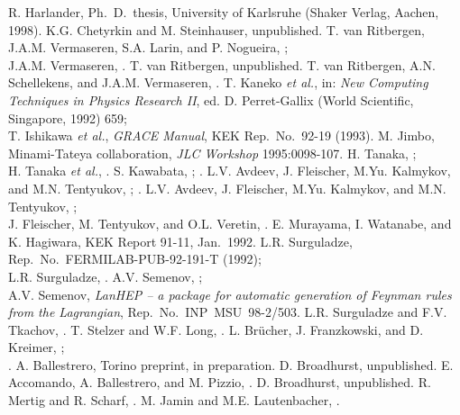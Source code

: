   R. Harlander, Ph.~D.~thesis, University of Karlsruhe
  (Shaker Verlag, Aachen, 1998).
  K.G. Chetyrkin and M. Steinhauser, unpublished.
  T. van Ritbergen, J.A.M. Vermaseren, S.A. Larin, and P. Nogueira,
  ;\\
  J.A.M. Vermaseren, .
  T. van Ritbergen, unpublished.
  T. van Ritbergen, A.N. Schellekens, and J.A.M. Vermaseren,
  .
  T. Kaneko {\it et al.}, in: {\it New Computing Techniques in Physics
    Research II}, ed. D. Perret-Gallix (World Scientific, Singapore,
    1992) 659;\\ T. Ishikawa {\it et al.}, {\it GRACE Manual}, KEK
    Rep.~No.\ 92-19 (1993).
  M. Jimbo, Minami-Tateya collaboration, {\it JLC Workshop} 1995:0098-107.
  H. Tanaka, ;\\
  H. Tanaka {\it et al.}, .
  S. Kawabata, ; .
  L.V. Avdeev, J. Fleischer, M.Yu. Kalmykov, and M.N. Tentyukov,
  ; .
  L.V. Avdeev, J. Fleischer, M.Yu. Kalmykov, and M.N. Tentyukov,
  ;\\
  J. Fleischer, M. Tentyukov, and O.L. Veretin, .
  E. Murayama, I. Watanabe, and K. Hagiwara, KEK Report 91-11, Jan.\ 1992.
  L.R. Surguladze, Rep.~No.~FERMILAB-PUB-92-191-T (1992);\\
  L.R. Surguladze, .
  A.V. Semenov, ;\\
  A.V. Semenov, {\it LanHEP -- a package for automatic generation of
    Feynman rules from the Lagrangian}, Rep.~No.~INP~MSU~98-2/503.
  L.R. Surguladze and F.V. Tkachov, .
  T. Stelzer and W.F. Long, . 
  L. Br\"ucher, J. Franzkowski, and D. Kreimer, ;\\
  .
 A. Ballestrero, Torino preprint, in preparation.
  D. Broadhurst, unpublished.
  E. Accomando, A. Ballestrero, and M. Pizzio, .
  D. Broadhurst, unpublished.
  R. Mertig and R. Scharf, .
  M. Jamin and M.E. Lautenbacher, .
